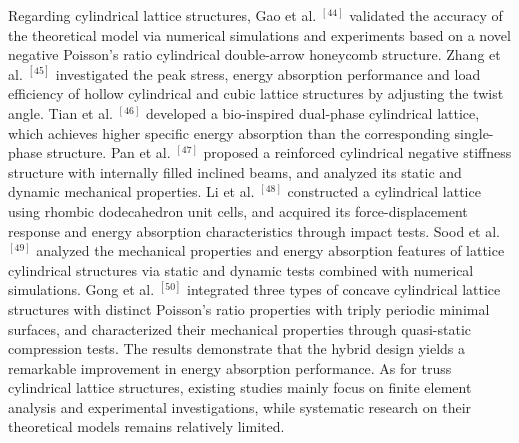 \documentclass{article} %
\begin{document}
Regarding cylindrical lattice structures, Gao et al. ${}^{[44]}$ validated the accuracy of the theoretical model via numerical simulations and experiments based on a novel negative Poisson's ratio cylindrical double-arrow honeycomb structure. Zhang et al. ${}^{[45]}$ investigated the peak stress, energy absorption performance and load efficiency of hollow cylindrical and cubic lattice structures by adjusting the twist angle. Tian et al. ${}^{[46]}$ developed a bio-inspired dual-phase cylindrical lattice, which achieves higher specific energy absorption than the corresponding single-phase structure. Pan et al. ${}^{[47]}$ proposed a reinforced cylindrical negative stiffness structure with internally filled inclined beams, and analyzed its static and dynamic mechanical properties. Li et al. ${}^{[48]}$ constructed a cylindrical lattice using rhombic dodecahedron unit cells, and acquired its force-displacement response and energy absorption characteristics through impact tests. Sood et al. ${}^{[49]}$ analyzed the mechanical properties and energy absorption features of lattice cylindrical structures via static and dynamic tests combined with numerical simulations. Gong et al. ${}^{[50]}$ integrated three types of concave cylindrical lattice structures with distinct Poisson's ratio properties with triply periodic minimal surfaces, and characterized their mechanical properties through quasi-static compression tests. The results demonstrate that the hybrid design yields a remarkable improvement in energy absorption performance. As for truss cylindrical lattice structures, existing studies mainly focus on finite element analysis and experimental investigations, while systematic research on their theoretical models remains relatively limited.
\end{document}
